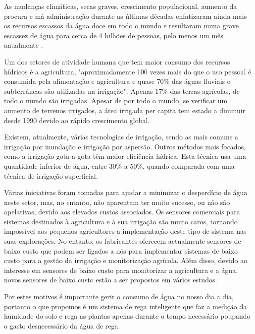 \documentclass[conference]{IEEEtran}
\begin{document}
As mudanças climáticas, secas graves, crescimento populacional, aumento da 
procura e má administração durante as últimas décadas enfatizaram ainda mais 
os recursos escassos da água doce em todo o mundo e resultaram numa grave 
escassez de água para cerca de 4 bilhões de pessoas, pelo menos um mês 
anualmente \cite{jafari2018assessing} \cite{unicef2019progress} \cite{orimoloye2021spatial}. \cite{salehi2022global}

Um dos setores de atividade humana que tem maior consumo dos recursos hídricos 
é a agricultura, "aproximadamente 100 vezes mais do que o uso pessoal é consumida 
pela alimentação e agricultura e quase 70\% das águas fluviais e subterrâneas 
são utilizadas na irrigação". \cite{nawandar2019iot} Apenas 17\% das terras 
agrícolas, de todo o mundo são irrigadas. Apesar de por todo o mundo, se verificar 
um aumento de terrenos irrigados, a área irrigada per capita tem estado a diminuir 
desde 1990 devido ao rápido crescimento global. \cite{pimentelwater}

Existem, atualmente, várias tecnologias de irrigação, sendo as mais comuns 
a irrigação por inundação e irrigação por aspersão. Outros métodos mais 
focados, como a irrigação gota-a-gota têm maior eficiência hídrica. Esta 
técnica usa uma quantidade inferior de água, entre 30\% a 50\%, quando 
comparada com uma técnica de irrigação superficial. \cite{pimentelwater}

Várias iniciativas foram tomadas para ajudar a minimizar o desperdício 
de água neste setor, mas, no entanto, não aparentam ter muito sucesso, 
ou não são apelativas, devido aos elevados custos associados. 
Os sensores comerciais para sistemas destinados à agricultura e à sua 
irrigação são muito caros, tornando impossível aos pequenos agricultores 
a implementação deste tipo de sistema nas suas explorações. No entanto, 
os fabricantes oferecem actualmente sensores de baixo custo que podem 
ser ligados a nós para implementar sistemas de baixo custo para a gestão da 
irrigação e monitorização agrícola. Além disso, devido ao interesse em 
sensores de baixo custo para monitorizar a agricultura e a água, 
novos sensores de baixo custo estão a ser propostos em vários estudos. \cite{garcia2020iot}

Por estes motivos é importante gerir o consumo de água no nosso dia a dia, 
portanto o que propomos é um sistema de rega inteligente que faz a 
medição da humidade do solo e rega as plantas apenas durante o tempo 
necessário poupando o gasto desnecessário da água de rega.
\end{document}
